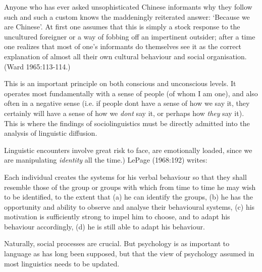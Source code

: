 	Anyone who has ever asked unsophisticated Chinese informants why they follow such and such a custom knows the maddeningly reiterated answer: \textquoteleft Because we are Chinese'. At first one assumes that this is simply a stock response to the uncultured foreigner or a way of fobbing off an impertinent outsider; after a time one realizes that most of one's informants do themselves see it as the correct explanation of almost all their own cultural behaviour and social organisation. (Ward 1965:113-114.)

	This is an important principle on both conscious and unconscious levels. It operates most fundamentally with a sense of people (of whom I am one), and also often in a negative sense (i.e. if people dont have a sense of how we say it, they certainly will have a sense of how we \textit{dont} say it, or perhaps how \textit{they} say it).  This is where the findings of sociolinguistics must be directly admitted into the analysis of linguistic diffusion. 

Linguistic encounters involve great risk to face, are emotionally loaded, since we are manipulating \textit{identity }all the time.) LePage (1968:192) writes:

	Each individual creates the systems for his verbal behaviour so that they shall resemble those of the group or groups with which from time to time he may wish to be identified, to the extent that
(a) he can identify the groups,
(b) he has the opportunity and ability to observe and analyse their behavioural systems,
(c) his motivation is sufficiently strong to impel him to choose, and to adapt his behaviour accordingly,
(d) he is still able to adapt his behaviour.


Naturally, social processes are crucial. But psychology is as important to language as has long been supposed, but that the view of psychology assumed in most linguistics needs to be updated.


